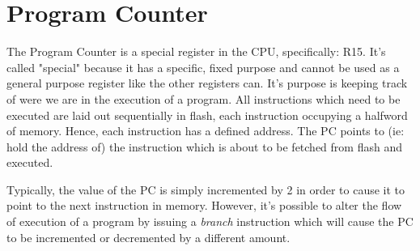 \section{Program Counter}
The Program Counter is a special register in the CPU, specifically: R15. It's called "special" because it has a specific, fixed purpose and cannot be used as a general purpose register like the other registers can. It's purpose is keeping track of were we are in the execution of a program. All instructions which need to be executed are laid out sequentially in flash, each instruction occupying a halfword of memory. Hence, each instruction has a defined address. The PC points to (ie: hold the address of) the instruction which is about to be fetched from flash and executed. 

Typically, the value of the PC is simply incremented by 2 in order to cause it to point to the next instruction in memory. However, it's possible to alter the flow of execution of a program by issuing a \emph{branch} instruction which will cause the PC to be incremented or decremented by a different amount.


